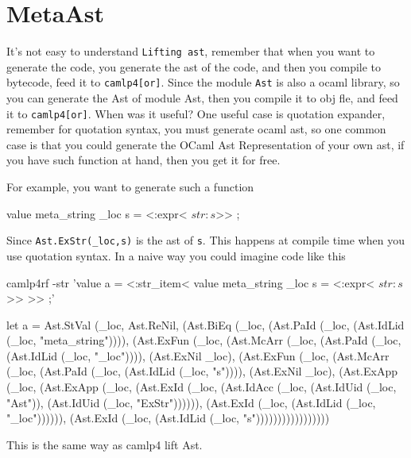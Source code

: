 

\section{MetaAst}

It's not easy to understand \verb|Lifting ast|, remember that when you
want to generate the code, you generate the ast of the code, and then
you compile to bytecode, feed it to \verb|camlp4[or]|. Since the
module \verb|Ast| is also a ocaml library, so you can generate the
Ast of module Ast, then you compile it to obj fle, and feed it to
\verb|camlp4[or]|. When was it  useful? One useful case is quotation
expander, remember for quotation syntax, you must generate ocaml ast,
so one common case is that you could generate the OCaml Ast
Representation  of your own ast, if you have such function at hand,
then you get it for free.

For example, you want to generate such a function 

\begin{ocamlcode}
value meta_string _loc s = <:expr< $str:s$>> ;
\end{ocamlcode}


Since \verb|Ast.ExStr(_loc,s)| is the ast of \verb|s|. This happens at
compile time when you use quotation syntax. In a naive way you could
imagine code like this 

\begin{bluetext}
camlp4rf -str 'value a = <:str_item< value meta_string _loc s = <:expr< $str:s$ >> >> ;'
\end{bluetext}

\begin{ocamlcode}
let a =
  Ast.StVal (_loc, Ast.ReNil,
    (Ast.BiEq (_loc, (Ast.PaId (_loc, (Ast.IdLid (_loc, "meta_string")))),
       (Ast.ExFun (_loc,
          (Ast.McArr (_loc, (Ast.PaId (_loc, (Ast.IdLid (_loc, "_loc")))),
             (Ast.ExNil _loc),
             (Ast.ExFun (_loc,
                (Ast.McArr (_loc, (Ast.PaId (_loc, (Ast.IdLid (_loc, "s")))),
                   (Ast.ExNil _loc),
                   (Ast.ExApp (_loc,
                      (Ast.ExApp (_loc,
                         (Ast.ExId (_loc,
                            (Ast.IdAcc (_loc, (Ast.IdUid (_loc, "Ast")),
                               (Ast.IdUid (_loc, "ExStr")))))),
                         (Ast.ExId (_loc, (Ast.IdLid (_loc, "_loc")))))),
                      (Ast.ExId (_loc, (Ast.IdLid (_loc, "s")))))))))))))))))
\end{ocamlcode}

This is the same way as camlp4 lift Ast.
